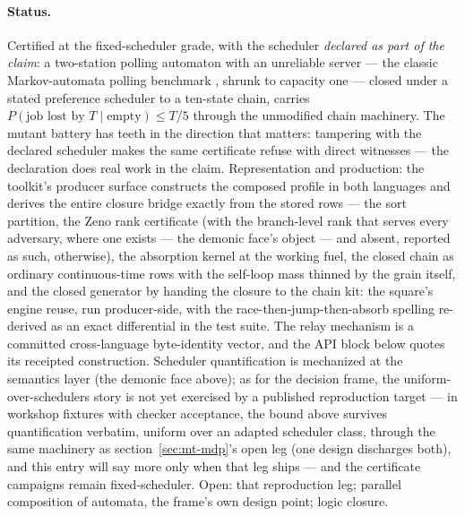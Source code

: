 \paragraph{Status.} Certified at the fixed-scheduler grade, with the
scheduler \emph{declared as part of the claim}: a two-station polling
automaton with an unreliable server --- the classic Markov-automata
polling benchmark \cite{guck14}, shrunk to capacity one --- closed
under a stated preference scheduler to a ten-state chain, carries $P(\text{job lost by } T \mid
\text{empty}) \le T/5$ through the unmodified chain machinery. The
mutant battery has teeth in the direction that matters: tampering
with the declared scheduler makes the same certificate refuse with
direct witnesses --- the declaration does real work in the claim. Representation and production: the toolkit's producer
surface constructs the composed profile in both languages and
derives the entire closure bridge exactly from the stored rows ---
the sort partition, the Zeno rank certificate (with the
branch-level rank that serves every adversary, where one exists ---
the demonic face's object --- and absent, reported as such,
otherwise), the
absorption kernel at the working fuel, the closed chain as ordinary
continuous-time rows with the self-loop mass thinned by the grain
itself, and the closed generator by handing the closure to the
chain kit: the square's engine reuse, run producer-side, with the
race-then-jump-then-absorb spelling re-derived as an exact
differential in the test suite. The relay mechanism is a committed
cross-language byte-identity vector, and the API block below quotes
its receipted construction. Scheduler quantification is mechanized at the semantics
layer (the demonic face above); as for the decision frame, the
uniform-over-schedulers story is not yet exercised by a published
reproduction target --- in workshop fixtures with checker acceptance,
the bound above survives quantification verbatim, uniform over an
adapted scheduler class, through the same machinery as
section~\ref{sec:mt-mdp}'s open leg (one design discharges both), and
this entry will say more only when that leg ships --- and the
certificate campaigns remain fixed-scheduler. Open: that reproduction
leg; parallel composition of automata, the frame's own design point;
logic closure.

